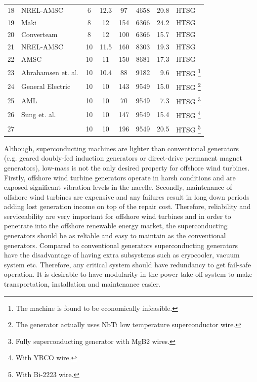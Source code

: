 \documentclass[12pt]{iopart}
\begin{document}
\begin{table}[]
\begin{minipage}{\textwidth}
\begin{tabular}{llcccrrl}
18 & NREL-AMSC \cite{Maples2010}  & 6 & 12.3 & 97 & 4658 & 20.8 & HTSG  \\
19 & Maki \cite{Maki2008}  & 8 & 12 & 154 & 6366 & 24.2 & HTSG  \\
20 & Converteam \cite{Lewis2007} & 8 & 12 & 100 & 6366 & 15.7 & HTSG  \\
21 & NREL-AMSC \cite{Maples2010} & 10 & 11.5 & 160 & 8303 & 19.3 & HTSG  \\
22 & AMSC \cite{Snitchler2010} & 10 & 11 & 150 & 8681 & 17.3 & HTSG  \\
23 & Abrahamsen et. al. \cite{Abrahamsen2010}& 10 & 10.4 & 88 & 9182 & 9.6 & HTSG \footnote{The machine is found to be economically infeasible.} \\
24 & General Electric \cite{Fair2012} & 10 & 10 & 143 & 9549 & 15.0 & HTSG \footnote{The generator actually uses NbTi low temperature superconductor wire.} \\
25 & AML \cite{Masson2011} & 10 & 10 & 70 & 9549 & 7.3 & HTSG \footnote{Fully superconducting generator with MgB2 wires.} \\
26 & Sung et. al. \cite{Sung2013} & 10 & 10 & 147 & 9549 & 15.4 & HTSG \footnote{With YBCO wire.} \\
27 & & 10 & 10 & 196 & 9549 & 20.5 & HTSG \footnote{With Bi-2223 wire.} \\
\hline
\end{tabular}
\end{minipage}
\end{table}

Although, superconducting machines are lighter than conventional generators (e.g. geared doubly-fed induction generators or direct-drive permanent magnet generators), low-mass is not the only desired property for offshore wind turbines. Firstly, offshore wind turbine generators operate in harsh conditions and are exposed significant vibration levels in the nacelle. Secondly, maintenance of offshore wind turbines are expensive and any failures result in long down periods adding lost generation income on top of the repair cost. Therefore, reliability and serviceability are very important for offshore wind turbines and in order to penetrate into the offshore renewable energy market, the superconducting generators should be as reliable and easy to maintain as the conventional generators. 
Compared to conventional generators superconducting generators have the disadvantage of having extra subsystems such as cryocooler, vacuum system etc. Therefore, any critical system should have redundancy to get fail-safe operation. It is desirable to have modularity in the power take-off system to make transportation, installation and maintenance easier.
\end{document}
